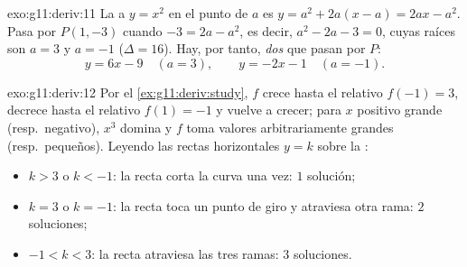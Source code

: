 \begin{solution}{exo:g11:deriv:11}
La  a $y = x^2$ en el punto de  $a$ es
$y = a^2 + 2a(x - a) = 2ax - a^2$. Pasa por $P(1, -3)$ cuando
$-3 = 2a - a^2$, es decir, $a^2 - 2a - 3 = 0$, cuyas raíces son $a = 3$ y
$a = -1$ ($\Delta = 16$). Hay, por tanto, \emph{dos}  que pasan
por $P$:
\[
y = 6x - 9 \quad (a = 3),
\qquad
y = -2x - 1 \quad (a = -1).
\]
\end{solution}

\begin{solution}{exo:g11:deriv:12}
Por el \cref{ex:g11:deriv:study}, $f$ crece hasta el  relativo
$f(-1) = 3$, decrece hasta el  relativo $f(1) = -1$ y vuelve a
crecer; para $x$ positivo grande (resp.\ negativo), $x^3$ domina y $f$
toma valores arbitrariamente grandes (resp.\ pequeños). Leyendo las rectas
horizontales $y = k$ sobre la :
\begin{itemize}
  \item $k > 3$ o $k < -1$: la recta corta la curva una vez: $1$ solución;
  \item $k = 3$ o $k = -1$: la recta toca un punto de giro y atraviesa
        otra rama: $2$ soluciones;
  \item $-1 < k < 3$: la recta atraviesa las tres ramas: $3$ soluciones.
\end{itemize}
\end{solution}

